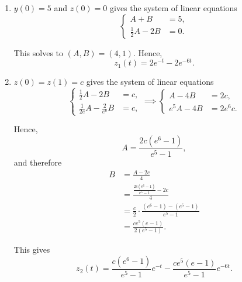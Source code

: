 \begin{enumerate}
    \item \(y(0) = 5\) and \(z(0) = 0\) gives the system of linear equations
          \[
              \left\{
              \begin{aligned}
                  A + B             & = 5, \\
                  \frac{1}{2}A - 2B & = 0.
              \end{aligned}
              \right.
          \]

          This solves to \((A, B) = (4, 1)\). Hence,
          \[
              z_1(t) = 2e^{-t} - 2e^{-6t}.
          \]

    \item \(z(0) = z(1) = c\) gives the system of linear equations
          \[
              \left\{
              \begin{aligned}
                  \frac{1}{2}A - 2B              & = c, \\
                  \frac{1}{2e}A - \frac{2}{e^6}B & = c,
              \end{aligned}
              \right.
              \implies
              \left\{
              \begin{aligned}
                  A - 4B     & = 2c,    \\
                  e^5 A - 4B & = 2e^6c.
              \end{aligned}
              \right.
          \]

          Hence,
          \[
              A = \frac{2c(e^6 - 1)}{e^5 - 1},
          \]
          and therefore
          \begin{align*}
              B & = \frac{A - 2c}{4}                                        \\
                & = \frac{\frac{2c(e^6 - 1)}{e^5 - 1} - 2c}{4}              \\
                & = \frac{c}{2} \cdot \frac{(e^6 - 1) - (e^5 - 1)}{e^5 - 1} \\
                & = \frac{c e^5 (e - 1)}{2(e^5 - 1)}.
          \end{align*}

          This gives
          \[
              z_2(t) = \frac{c(e^6 - 1)}{e^5 - 1} e^{-t} - \frac{ce^5 (e - 1)}{e^5 - 1} e^{-6t}.
          \]


\end{enumerate}
